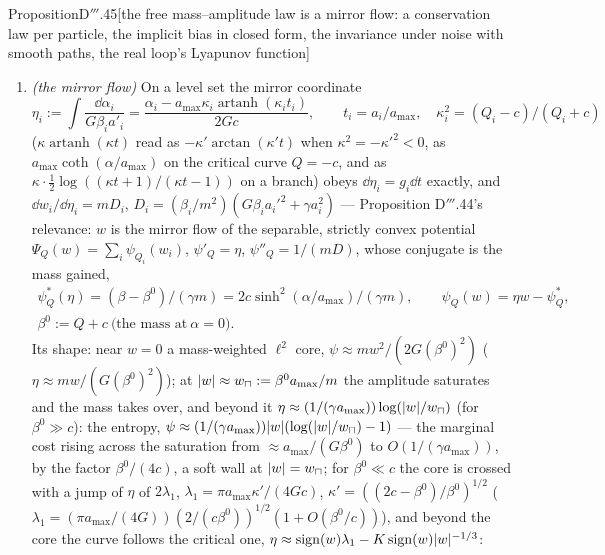 \begin{thm}{Proposition}{D$'''$.45}[the free mass--amplitude law is a mirror flow: a conservation law per particle, the
implicit bias in closed form, the invariance under noise with smooth paths, the real loop's Lyapunov
function]
\begin{enumerate}[label=\textup{(\roman*)}]
    finite time; for $Q_i > -c$ the curve is a graph over all $\alpha\in\R$ and $w_i$ ranges over $\R$; for
    $Q_i\le-c$ it has two branches $\abs{\alpha_i} > \alpha_0$ ($\cosh(2\alpha_0/a_{\max}) = -Q_i/c$), $\beta\to0$ at
    $\alpha_0$, and on each the sign of $w_i$ is frozen (\hyperref[res:thmDppp:47]{Proposition D$'''$.47}).
  \item \emph{(the mirror flow)} On a level set the mirror coordinate
    \[
      \eta_i := \int\frac{\dd\alpha_i}{G\beta_ia'_i}
      = \frac{\alpha_i - a_{\max}\kappa_i\operatorname{artanh}(\kappa_it_i)}{2Gc},\qquad
      t_i = a_i/a_{\max},\quad \kappa_i^2 = (Q_i - c)/(Q_i + c)
    \]
    ($\kappa\operatorname{artanh}(\kappa t)$ read as $-\kappa'\arctan(\kappa't)$ when $\kappa^2 = -\kappa'^2 < 0$, as
    $a_{\max}\coth(\alpha/a_{\max})$ on the critical curve $Q = -c$, and as
    $\kappa\cdot\frac12\log((\kappa t + 1)/(\kappa t - 1))$ on a branch) obeys $\dd\eta_i = g_i\dd t$ exactly, and
    $\dd w_i/\dd\eta_i = mD_i$, $D_i = (\beta_i/m^2)(G\beta_ia_i'^2 + \gamma a_i^2)$ --- Proposition D$'''$.44's
    relevance: $w$ is the mirror flow of the separable, strictly convex potential
    $\Psi_Q(w) = \sum_i\psi_{Q_i}(w_i)$, $\psi'_Q = \eta$, $\psi''_Q = 1/(mD)$, whose conjugate is the mass gained,
    \begin{gather*}
      \psi^*_Q(\eta) = (\beta - \beta^0)/(\gamma m) = 2c\sinh^2(\alpha/a_{\max})/(\gamma m),\qquad
      \psi_Q(w) = \eta w - \psi^*_Q,\\
      \beta^0 := Q + c\ \text{(the mass at}\ \alpha = 0).
    \end{gather*}
    Its shape: near $w = 0$ a mass-weighted $\ell^2$ core, $\psi\approx mw^2/(2G(\beta^0)^2)$
    ($\eta\approx mw/(G(\beta^0)^2)$); at $\lvert w\rvert\approx w_\sqcap := \beta^0a_{\max}/m$ the amplitude saturates and the
    mass takes over, and beyond it $\eta\approx(1/(\gamma a_{\max}))\log(\lvert w\rvert/w_\sqcap)$ (for $\beta^0\gg c$): the
    entropy, $\psi\approx(1/(\gamma a_{\max}))\lvert w\rvert(\log(\lvert w\rvert/w_\sqcap) - 1)$ --- the marginal cost rising across the
    saturation from $\approx a_{\max}/(G\beta^0)$ to $O(1/(\gamma a_{\max}))$, by the factor $\beta^0/(4c)$, a soft wall
    at $\lvert w\rvert = w_\sqcap$; for $\beta^0\ll c$ the core is crossed with a jump of $\eta$ of $2\lambda_1$,
    $\lambda_1 = \pi a_{\max}\kappa'/(4Gc)$, $\kappa' = ((2c - \beta^0)/\beta^0)^{1/2}$
    ($\lambda_1 = (\pi a_{\max}/(4G))(2/(c\beta^0))^{1/2}(1 + O(\beta^0/c))$), and beyond the core the curve follows
    the critical one, $\eta\approx\operatorname{sign}(w)\lambda_1 - K\operatorname{sign}(w)\lvert w\rvert^{-1/3}$:

\end{enumerate}
\end{thm}
